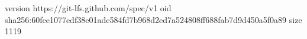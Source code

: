 version https://git-lfs.github.com/spec/v1
oid sha256:60fce1077edf38e01adc584fd7b968d2ed7a524808ff688fab7d9d450a5f0a89
size 1119
